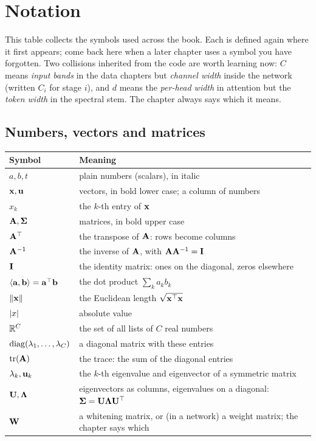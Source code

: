\chapter{Notation}\label{ch:notation}

This table collects the symbols used across the book. Each is defined again where it first
appears; come back here when a later chapter uses a symbol you have forgotten. Two collisions
inherited from the code are worth learning now: $C$ means \emph{input bands} in the data chapters
but \emph{channel width} inside the network (written $C_i$ for stage $i$), and $d$ means the
\emph{per-head width} in attention but the \emph{token width} in the spectral stem. The chapter
always says which it means.

\section*{Numbers, vectors and matrices}
\begin{longtable}{@{}p{30mm}p{110mm}@{}}
\toprule
Symbol & Meaning \\
\midrule\endhead
$a, b, t$ & plain numbers (scalars), in italic \\
$\mathbf{x}, \mathbf{u}$ & vectors, in bold lower case; a column of numbers \\
$x_k$ & the $k$-th entry of $\mathbf{x}$ \\
$\mathbf{A}, \boldsymbol{\Sigma}$ & matrices, in bold upper case \\
$\mathbf{A}^{\top}$ & the transpose of $\mathbf{A}$: rows become columns \\
$\mathbf{A}^{-1}$ & the inverse of $\mathbf{A}$, with $\mathbf{A}\mathbf{A}^{-1} = \mathbf{I}$ \\
$\mathbf{I}$ & the identity matrix: ones on the diagonal, zeros elsewhere \\
$\left\langle \mathbf{a}, \mathbf{b} \right\rangle = \mathbf{a}^{\top}\mathbf{b}$ & the dot product $\sum_k a_k b_k$ \\
$\left\lVert \mathbf{x} \right\rVert$ & the Euclidean length $\sqrt{\mathbf{x}^{\top}\mathbf{x}}$ \\
$\left\lvert x \right\rvert$ & absolute value \\
$\mathbb{R}^{C}$ & the set of all lists of $C$ real numbers \\
$\operatorname{diag}(\lambda_1,\dots,\lambda_C)$ & a diagonal matrix with these entries \\
$\operatorname{tr}(\mathbf{A})$ & the trace: the sum of the diagonal entries \\
$\lambda_k, \mathbf{u}_k$ & the $k$-th eigenvalue and eigenvector of a symmetric matrix \\
$\mathbf{U}, \boldsymbol{\Lambda}$ & eigenvectors as columns, eigenvalues on a diagonal: $\boldsymbol{\Sigma} = \mathbf{U}\boldsymbol{\Lambda}\mathbf{U}^{\top}$ \\
$\mathbf{W}$ & a whitening matrix, or (in a network) a weight matrix; the chapter says which \\
\bottomrule
\end{longtable}

